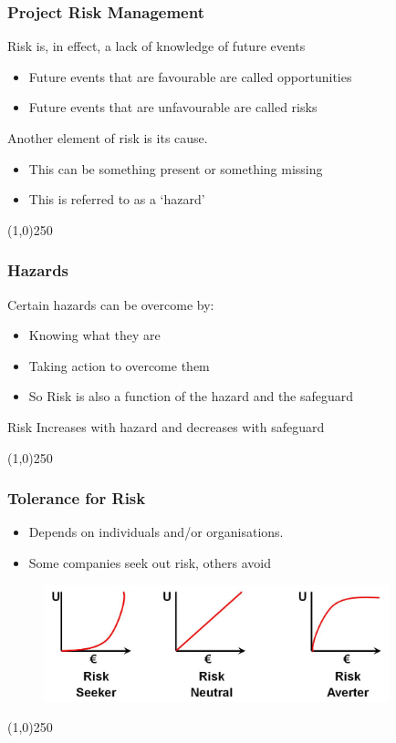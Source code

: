 \begin{frame}
\frametitle{Project Risk Management}
Risk is, in effect, a lack of knowledge of future events
\begin{itemize}
	\item Future events that are favourable are called opportunities
	\item Future events that are unfavourable are called risks
\end{itemize}
Another element of risk is its cause.
\begin{itemize}
	\item This can be something present or something missing
	\item This is referred to as a `hazard'
\end{itemize}
\end{frame}\begin{center}\line(1,0){250}\end{center}







\begin{frame}
\frametitle{Hazards}
Certain hazards can be overcome by:
\begin{itemize}
	\item Knowing what they are
	\item Taking action to overcome them
	\item So Risk is also a function of the hazard and the safeguard
\end{itemize}
Risk Increases with hazard and decreases with safeguard

\end{frame}\begin{center}\line(1,0){250}\end{center}





\begin{frame}
\frametitle{Tolerance for Risk}
	\begin{itemize}
		\item Depends on individuals and/or organisations.
		\item Some companies seek out risk, others avoid
	\end{itemize}
\begin{figure}[h]
	\centering
		\includegraphics[width = 10cm]{images/Utility1.jpg}
	\label{fig:Utility1}
\end{figure}

\end{frame}\begin{center}\line(1,0){250}\end{center}





